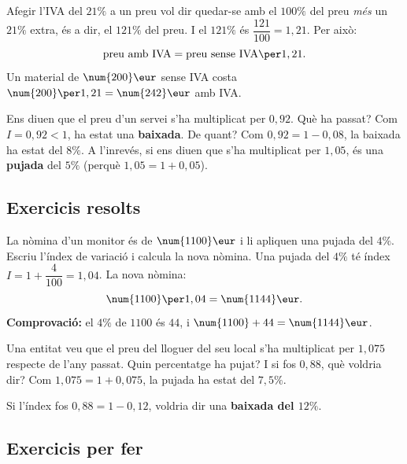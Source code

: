 \begin{exemple}
Afegir l'IVA del $21\%$ a un preu vol dir quedar-se amb el $100\%$ del preu \emph{més}
un $21\%$ extra, és a dir, el $121\%$ del preu. I el $121\%$ és $\dfrac{121}{100}=1,21$.
Per això:
\[
\text{preu amb IVA}=\text{preu sense IVA}\per 1,21.
\]
Un material de $\num{200}\eur$ sense IVA costa $\num{200}\per 1,21=\num{242}\eur$ amb
IVA.
\end{exemple}

\begin{exemple}
Ens diuen que el preu d'un servei s'ha multiplicat per $0,92$. Què ha passat? Com
$I=0,92<1$, ha estat una \textbf{baixada}. De quant? Com $0,92=1-0,08$, la baixada ha
estat del $8\%$. A l'inrevés, si ens diuen que s'ha multiplicat per $1,05$, és una
\textbf{pujada} del $5\%$ (perquè $1,05=1+0,05$).
\end{exemple}

\subsection{Exercicis resolts}

\begin{exresolt}
La nòmina d'un monitor és de $\num{1100}\eur$ i li apliquen una pujada del $4\%$.
Escriu l'índex de variació i calcula la nova nòmina.
\solucio
Una pujada del $4\%$ té índex $I=1+\dfrac{4}{100}=1,04$. La nova nòmina:
\[
\num{1100}\per 1,04=\num{1144}\eur.
\]
\textbf{Comprovació:} el $4\%$ de $\num{1100}$ és $44$, i $\num{1100}+44=\num{1144}\eur$.
\end{exresolt}

\begin{exresolt}
Una entitat veu que el preu del lloguer del seu local s'ha multiplicat per $1,075$
respecte de l'any passat. Quin percentatge ha pujat? I si fos $0,88$, què voldria dir?
\solucio
Com $1,075=1+0,075$, la pujada ha estat del $7,5\%$.

Si l'índex fos $0,88=1-0,12$, voldria dir una \textbf{baixada del $12\%$}.
\end{exresolt}

\subsection{Exercicis per fer}

